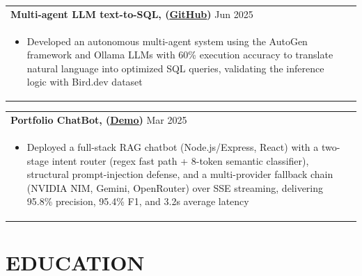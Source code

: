 \documentclass[a4paper,10pt]{extarticle}
\begin{document}
\vspace{-2pt}

\begin{tabularx}{\linewidth}{ @{}l r@{} }
\color[HTML]{000000} \textbf{{{Multi-agent LLM text-to-SQL, (}\uline{\href{https://github.com/SwapnilMane22/MultiAgent-Text-to-SQL}{GitHub}})}} \hfill \color[HTML]{000000}Jun 2025 \\[2pt]
\begin{minipage}[t]{\linewidth}
    \begin{itemize}[nosep, leftmargin=2em, itemsep=1pt]
        \item Developed an autonomous multi-agent system using the AutoGen framework and Ollama LLMs with 60\% execution accuracy to translate natural language into optimized SQL queries, validating the inference logic with Bird.dev dataset
    \end{itemize}
    \end{minipage}
\end{tabularx}

\vspace{-2pt}

\begin{tabularx}{\linewidth}{ @{}l r@{} }
\color[HTML]{000000} \textbf{{{Portfolio ChatBot, (}\uline{\href{https://swapnilmane22.github.io/portfolio/}{Demo}})}} \hfill \color[HTML]{000000}Mar 2025 \\[2pt]
\begin{minipage}[t]{\linewidth}
    \begin{itemize}[nosep,after=\strut, leftmargin=2em, itemsep=1pt]
        \item Deployed a full-stack RAG chatbot (Node.js/Express, React) with a two-stage intent router (regex fast path + 8-token semantic classifier), structural prompt-injection defense, and a multi-provider fallback chain (NVIDIA NIM, Gemini, OpenRouter) over SSE streaming, delivering 95.8\% precision, 95.4\% F1, and 3.2s average latency
    \end{itemize}
    \end{minipage}
\end{tabularx}

\vspace{4pt}

\section{{EDUCATION}}
\vspace{4pt}
\end{document}

